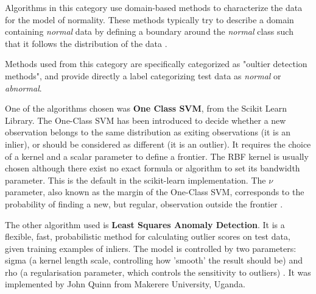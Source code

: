 Algorithms in this category use domain-based methods to characterize the data for the model of normality. These methods typically try to describe a domain containing \emph{normal}  data by defining a boundary around the \emph{normal} class such that it follows the distribution of the data \cite{Pimentel2014}.

Methods used from this category are specifically categorized as "oultier detection methods", and provide directly a label categorizing test data as \emph{normal} or \emph{abnormal}.

One of the algorithms chosen was \textbf{One Class SVM}, from the Scikit Learn Library\cite{scikit-learn}. The One-Class SVM has been introduced to decide whether a new observation belongs to the same distribution as exiting observations (it is an inlier), or should be considered as different (it is an outlier). It requires the choice of a kernel and a scalar parameter to define a frontier. The RBF kernel is usually chosen although there exist no exact formula or algorithm to set its bandwidth parameter. This is the default in the scikit-learn implementation. The $\nu$ parameter, also known as the margin of the One-Class SVM, corresponds to the probability of finding a new, but regular, observation outside the frontier \cite{scikit-learn}.

The other algorithm used is \textbf{Least Squares Anomaly Detection}. It is a flexible, fast, probabilistic method for calculating outlier scores on test data, given training examples of inliers. The model is controlled by two parameters: sigma (a kernel length scale, controlling how 'smooth' the result should be) and rho (a regularisation parameter, which controls the sensitivity to outliers) \cite{lsa}. It was implemented by John Quinn from Makerere University, Uganda.

\begin{flushright}

\end{flushright}